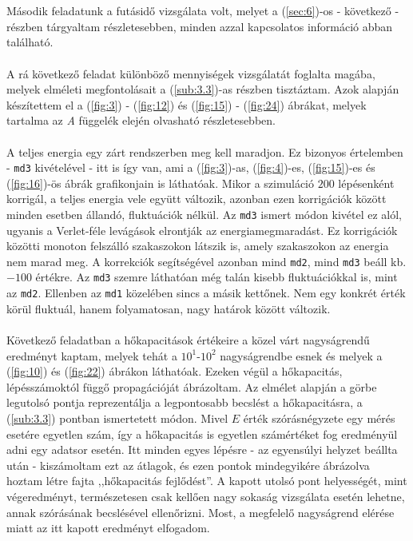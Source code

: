 \begin{multicols}{2}
\\ \\
Második feladatunk a futásidő vizsgálata volt, melyet a (\ref{sec:6})-os - következő - részben tárgyaltam részletesebben, minden azzal kapcsolatos információ abban található.
\\ \\
A rá következő feladat különböző mennyiségek vizsgálatát foglalta magába, melyek elméleti megfontolásait a (\ref{sub:3.3})-as részben tisztáztam. Azok alapján készítettem el a (\ref{fig:3}) - (\ref{fig:12}) és (\ref{fig:15}) - (\ref{fig:24}) ábrákat, melyek tartalma az \emph{A} függelék elején olvasható részletesebben.
\\ \\
A teljes energia egy zárt rendszerben meg kell maradjon. Ez bizonyos értelemben - \texttt{md3} kivételével - itt is így van, ami a (\ref{fig:3})-as, (\ref{fig:4})-es, (\ref{fig:15})-es és (\ref{fig:16})-ös ábrák grafikonjain is láthatóak. Mikor a szimuláció $200$ lépésenként korrigál, a teljes energia vele együtt változik, azonban ezen korrigációk között minden esetben állandó, fluktuációk nélkül. Az \texttt{md3} ismert módon kivétel ez alól, ugyanis a Verlet-féle levágások elrontják az energiamegmaradást. Ez korrigációk közötti monoton felszálló szakaszokon látszik is, amely szakaszokon az energia nem marad meg. A korrekciók segítségével azonban mind \texttt{md2}, mind \texttt{md3} beáll kb. $-100$ értékre. Az \texttt{md3} szemre láthatóan még talán kisebb fluktuációkkal is, mint az \texttt{md2}. Ellenben az \texttt{md1} közelében sincs a másik kettőnek. Nem egy konkrét érték körül fluktuál, hanem folyamatosan, nagy határok között változik.
\\ \\
Következő feladatban a hőkapacitások értékeire a közel várt nagyságrendű eredményt kaptam, melyek tehát a $10^{1}$-$10^{2}$ nagyságrendbe esnek és melyek a (\ref{fig:10}) és (\ref{fig:22}) ábrákon láthatóak. Ezeken végül a hőkapacitás, lépésszámoktól függő propagációját ábrázoltam. Az elmélet alapján a görbe legutolsó pontja reprezentálja a legpontosabb becslést a hőkapacitásra, a (\ref{sub:3.3}) pontban ismertetett módon. Mivel $E$ érték szórásnégyzete egy mérés esetére egyetlen szám, így a hőkapacitás is egyetlen számértéket fog eredményül adni egy adatsor esetén. Itt minden egyes lépésre - az egyensúlyi helyzet beállta után - kiszámoltam ezt az átlagok, és ezen pontok mindegyikére ábrázolva hoztam létre fajta ,,hőkapacitás fejlődést''. A kapott utolsó pont helyességét, mint végeredményt, természetesen csak kellően nagy sokaság vizsgálata esetén lehetne, annak szórásának becslésével ellenőrizni. Most, a megfelelő nagyságrend elérése miatt az itt kapott eredményt elfogadom.

\end{multicols}
